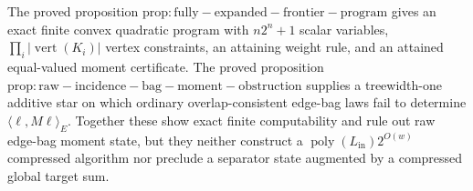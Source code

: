 The proved proposition \(\mathrm{prop:fully-expanded-frontier-program}\) gives an exact finite convex quadratic program with \(n2^n+1\) scalar variables, \(\prod_i|\operatorname{vert}(K_i)|\) vertex constraints, an attaining weight rule, and an attained equal-valued moment certificate.  The proved proposition \(\mathrm{prop:raw-incidence-bag-moment-obstruction}\) supplies a treewidth-one additive star on which ordinary overlap-consistent edge-bag laws fail to determine \(\langle\ell,M\ell\rangle_E\).  Together these show exact finite computability and rule out raw edge-bag moment state, but they neither construct a \(\operatorname{poly}(L_{\mathrm{in}})2^{O(w)}\) compressed algorithm nor preclude a separator state augmented by a compressed global target sum.